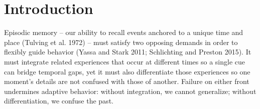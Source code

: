 \documentclass[
  letterpaper,
  11pt,
  english,
  singlespacing,
  headsepline]{MastersDoctoralThesis}
\begin{document}




% 

\begingroup
\hypersetup{linkcolor=black}

\tableofcontents %

\listoffigures %

\listoftables %

\endgroup







\mainmatter %

\pagestyle{thesis} %
\newcommand{\keyword}[1]{\textbf{#1}}
\newcommand{\tabhead}[1]{\textbf{#1}}
\newcommand{\code}[1]{\texttt{#1}}
\newcommand{\file}[1]{\texttt{\bfseries#1}}
\newcommand{\option}[1]{\texttt{\itshape#1}}



\chapter*{Introduction}\label{introduction}


Episodic memory -- our ability to recall events anchored to a unique
time and place (Tulving et al. 1972) -- must satisfy two opposing
demands in order to flexibly guide behavior (Yassa and Stark 2011;
Schlichting and Preston 2015). It must integrate related experiences
that occur at different times so a single cue can bridge temporal gaps,
yet it must also differentiate those experiences so one moment's details
are not confused with those of another. Failure on either front
undermines adaptive behavior: without integration, we cannot generalize;
without differentiation, we confuse the past.
\end{document}
